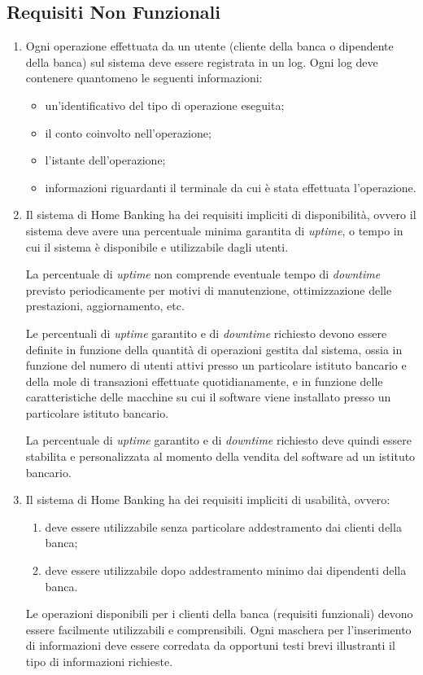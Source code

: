 \subsection{Requisiti Non Funzionali}
\label{sec:utente:non-funzionali}

\begin{enumerate}
	\item \label{itm:utente:non-funzionali:logging} Ogni operazione effettuata da un utente (cliente della banca o dipendente della banca) sul sistema deve essere registrata in un log.
	Ogni log deve contenere quantomeno le seguenti informazioni:
	\begin{itemize}
		\item un'identificativo del tipo di operazione eseguita;
		\item il conto coinvolto nell'operazione;
		\item l'istante dell'operazione;
		\item informazioni riguardanti il terminale da cui \`e stata effettuata l'operazione.
	\end{itemize}

	\item Il sistema di Home Banking ha dei requisiti impliciti di disponibilit\`a, ovvero il sistema deve avere una percentuale minima garantita di \emph{uptime}, o tempo in cui il sistema \`e disponibile e utilizzabile dagli utenti.

	La percentuale di \emph{uptime} non comprende eventuale tempo di \emph{downtime} previsto periodicamente per motivi di manutenzione, ottimizzazione delle prestazioni, aggiornamento, etc.

	Le percentuali di \emph{uptime} garantito e di \emph{downtime} richiesto devono essere definite in funzione della quantit\`a di operazioni gestita dal sistema, ossia in funzione del numero di utenti attivi presso un particolare istituto bancario e della mole di transazioni effettuate quotidianamente, e in funzione delle caratteristiche delle macchine su cui il software viene installato presso un particolare istituto bancario.

	La percentuale di \emph{uptime} garantito e di \emph{downtime} richiesto deve quindi essere stabilita e personalizzata al momento della vendita del software ad un istituto bancario.

	\item Il sistema di Home Banking ha dei requisiti impliciti di usabilit\`a, ovvero:
	\begin{enumerate}
		\item deve essere utilizzabile senza particolare addestramento dai clienti della banca;
		\item deve essere utilizzabile dopo addestramento minimo dai dipendenti della banca.
	\end{enumerate}
	Le operazioni disponibili per i clienti della banca (requisiti funzionali) devono essere facilmente utilizzabili e comprensibili.
	Ogni maschera per l'inserimento di informazioni deve essere corredata da opportuni testi brevi illustranti il tipo di informazioni richieste.
\end{enumerate}


